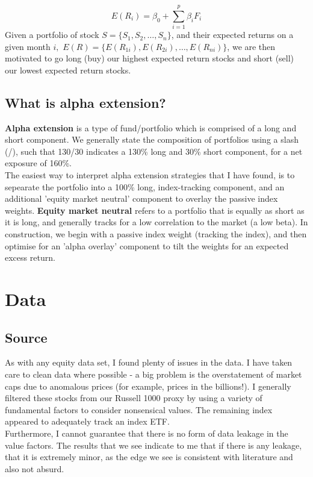 \documentclass[12pt]{article}
\begin{document}
$$ E(R_i) = \beta_0 + \sum_{i=1}^p \beta_i F_i$$
Given a portfolio of stock $S = \{S_1, S_2, \dots, S_n\}$, and their expected returns on a given month $i,$ $E(R) = \{E(R_{1i}), E(R_{2i}), \dots, E(R_{ni})\}$, we are then motivated to go long (buy) our highest
expected return stocks and short (sell) our lowest expected return stocks.
\subsection{What is alpha extension?}
\textbf{Alpha extension} is a type of fund/portfolio which is comprised of a long and short component. We 
generally state the composition of portfolios using a slash (/), such that 130/30 indicates a 130\% long 
and 30\% short component, for a net exposure of 160\%.
\newline \\ 
The easiest way to interpret alpha extension strategies that I have found, is to sepearate the portfolio
into a 100\% long, index-tracking component, and an additional 'equity market neutral' component to overlay
the passive index weights. \textbf{Equity market neutral} refers to a portfolio that is equally as short 
as it is long, and generally tracks for a low correlation to the market (a low beta).
In construction, we begin with a passive index weight (tracking the index), and then optimise for an 'alpha 
overlay' component to tilt the weights for an expected excess return.

\section{Data}
\subsection{Source}

As with any equity data set, I found plenty of issues in the data. I have taken care to clean data where possible - a big problem is the overstatement of market caps due to anomalous prices (for example, prices 
in the billions!). I generally filtered these stocks from our Russell 1000 proxy by using a variety 
of fundamental factors to consider nonsensical values. The remaining index appeared to adequately
track an index ETF.
\newline \\ 
Furthermore, I cannot guarantee that there is no form of data leakage in the value factors. The results
that we see indicate to me that if there is any leakage, that it is extremely minor, as the edge we see 
is consistent with literature and also not absurd.
\end{document}
